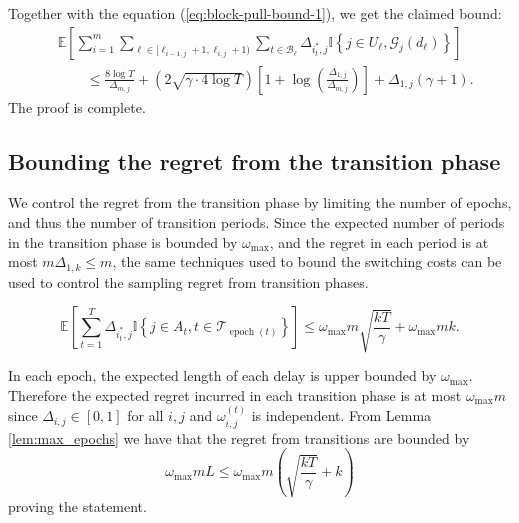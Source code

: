 \documentclass[opre,blindrev]{informs3}
\newcommand{\epoch}{\operatorname{epoch}}
\newcommand{\ind}[1]{\mathbb{I}\left\{#1\right\}}
\newcommand{\bE}[1]{{\mathbb{E}\left[#1\right]}}
\begin{document}
\begin{APPENDICES}
    Together with the equation (\ref{eq:block-pull-bound-1}), we get the claimed bound:
    \begin{align*}
        &\bE{\sum_{i=1}^m \sum_{\ell \in [\ell_{i-1,j}+1, \ell_{i,j}+1)}\sum_{t \in \mathcal{B}_\ell}\Delta_{i^*_t,j}\ind{j \in U_{\ell}, \mathcal{G}_j(d_\ell)}}
        \\
        &\qquad \leq \frac{8\log T}{\Delta_{m,j}}+\left(2\sqrt{\gamma \cdot 4\log T}\right)\left[1+\log\left(\frac{\Delta_{1,j}}{\Delta_{m,j}}\right)\right] + \Delta_{1,j}(\gamma + 1).
    \end{align*}
The proof is complete. 
\Halmos  

\subsection{Bounding the regret from the transition phase}
We control the regret from the transition phase by limiting the number of epochs, and thus the number of transition periods. Since the expected number of periods in the transition phase is bounded by \(\omega_{\max}\), and the regret in each period is at most \(m\Delta_{1,k}\leq m\), the same techniques used to bound the switching costs can be used to control the sampling regret from transition phases. 

\begin{lemma}\label{lem:transition-regret}
    \[\bE{\sum_{t=1}^T\Delta_{i^*_t, j}\ind{j\in A_t, t\in \mathcal{T}_{\epoch(t)}}}\leq \omega_{\max}m\sqrt{\frac{kT}{\gamma}}+\omega_{\max}mk.\]
\end{lemma}
    In each epoch, the expected length of each delay is upper bounded by \(\omega_{\max}\). Therefore the expected regret incurred in each transition phase is at most \(\omega_{\max} m\) since \(\Delta_{i,j}\in [0,1]\) for all \(i,j\) and \(\omega_{i,j}^{(t)}\) is independent. From Lemma \ref{lem:max_epochs} we have that the regret from transitions are bounded by
    \[\omega_{\max}mL\leq \omega_{\max}m\left(\sqrt{\frac{kT}{\gamma}}+k\right)\]
    proving the statement.
\Halmos  


\end{APPENDICES}
\end{document}
